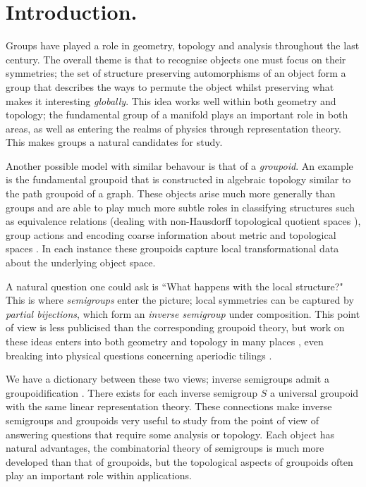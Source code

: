 \chapter{Introduction.}

Groups have played a role in geometry, topology and analysis throughout the last century. The overall theme is that to recognise objects one must focus on their symmetries; the set of structure preserving automorphisms of an object form a group that describes the ways to permute the object whilst preserving what makes it interesting \textit{globally}. This idea works well within both geometry and topology; the fundamental group of a manifold plays an important role in both areas, as well as entering the realms of physics through representation theory. This makes groups a natural candidates for study.

Another possible model with similar behavour is that of a \textit{groupoid}. An example is the fundamental groupoid that is constructed in algebraic topology similar to the path groupoid of a graph. These objects arise much more generally than groups and are able to play much more subtle roles in classifying structures such as equivalence relations (dealing with non-Hausdorff topological quotient spaces \cite{MR1826266}), group actions and encoding coarse information about metric and topological spaces \cite{MR1905840}. In each instance these groupoids capture local transformational data about the underlying object space.

A natural question one could ask is ``What happens with the local structure?" This is where \textit{semigroups} enter the picture; local symmetries can be captured by \textit{partial bijections}, which form an \textit{inverse semigroup} under composition. This point of view is less publicised than the corresponding groupoid theory, but work on these ideas enters into both geometry and topology in many places \cite{MR0160848,MR1694900,MR1798993}, even breaking into physical questions concerning aperiodic tilings \cite{MR1798993,MR2041539}.

We have a dictionary between these two views; inverse semigroups admit a groupoidification \cite{MR1724106,MR2419901}. There exists for each inverse semigroup $S$ a universal groupoid with the same linear representation theory. These connections make inverse semigroups and groupoids very useful to study from the point of view of answering questions that require some analysis or topology. Each object has natural advantages, the combinatorial theory of semigroups is much more developed than that of groupoids, but the topological aspects of groupoids often play an important role within applications.

